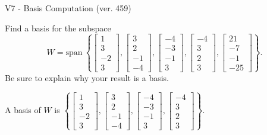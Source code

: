 \begin{exercise}
  \begin{exerciseTitle}V7 - Basis Computation (ver. 459)\end{exerciseTitle}
  \begin{exerciseStatement}
    Find a basis for the subspace 
\[W=\mathrm{span}\ \left\{\left[\begin{array}{r}
1 \\
3 \\
-2 \\
3
\end{array}\right] , \left[\begin{array}{r}
3 \\
2 \\
-1 \\
-4
\end{array}\right] , \left[\begin{array}{r}
-4 \\
-3 \\
-1 \\
3
\end{array}\right] , \left[\begin{array}{r}
-4 \\
3 \\
2 \\
3
\end{array}\right] , \left[\begin{array}{r}
21 \\
-7 \\
-1 \\
-25
\end{array}\right]\right\}.\]
 Be sure to explain why your result is a basis.


  \end{exerciseStatement}
  \begin{exerciseAnswer}
   A basis of \(W\) is  \(\left\{\left[\begin{array}{r}
1 \\
3 \\
-2 \\
3
\end{array}\right] , \left[\begin{array}{r}
3 \\
2 \\
-1 \\
-4
\end{array}\right] , \left[\begin{array}{r}
-4 \\
-3 \\
-1 \\
3
\end{array}\right] , \left[\begin{array}{r}
-4 \\
3 \\
2 \\
3
\end{array}\right]\right\}\).
  


  \end{exerciseAnswer}
\end{exercise}